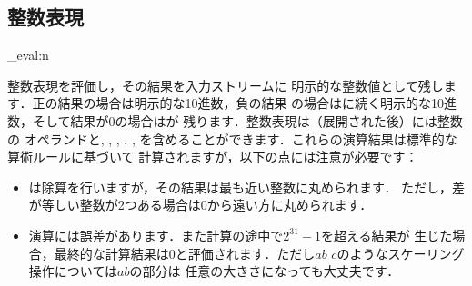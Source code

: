 \documentclass[dvipdfmx,full,kernel]{wtpl3doc}
\begin{document}
\begin{documentation}
\section{整数表現}
%
\begin{function}[EXP]{\int_eval:n}
  \begin{syntax}
     
  \end{syntax}
  整数表現を評価し，その結果を入力ストリームに
  明示的な整数値として残します．正の結果の場合は明示的な10進数，負の結果
  の場合は\code{-}に続く明示的な10進数，そして結果が0の場合はが
  残ります．整数表現は（展開された後）には整数の
  オペランドと\code{+}, \code{-}, \code{*}, \code{/}, \code{(}, \code{)}%
  を含めることができます．これらの演算結果は標準的な算術ルールに基づいて
  計算されますが，以下の点には注意が必要です：
%
  \begin{itemize}
  \item \code{/}は除算を行いますが，その結果は最も近い整数に丸められます．
    ただし，差が等しい整数が2つある場合は0から遠い方に丸められます．
%
  \item 演算には誤差があります．また計算の途中で$2^{31}-1$を超える結果が
    生じた場合，最終的な計算結果は0と評価されます．ただし$a$\code{*}$b$%
    \code{/}$c$のようなスケーリング操作については$a$\code{*}$b$の部分は
    任意の大きさになっても大丈夫です．
%

\end{itemize}
\end{function}
\end{documentation}
\end{document}
